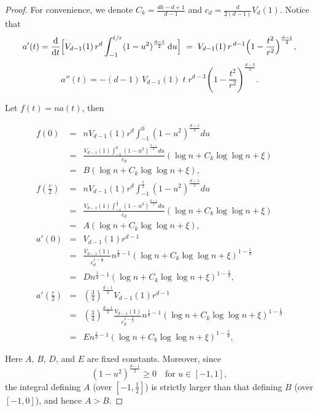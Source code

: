 \documentclass[preprint,12pt]{elsarticle}
\begin{document}
\begin{proof}
	For convenience, we denote $C_k=\frac{dk-d+1}{d-1}$ and $c_d = \frac{d}{2(d-1)}V_d(1)$. Notice that
	$$
	a'(t)
	=\frac{\mathrm{d}}{\mathrm{d}t}\Bigl[V_{d-1}(1)\,r^d
	\int_{-1}^{t/r}(1-u^2)^{\frac{d-1}2}\,\mathrm{d}u\Bigr]
	\;=\;V_{d-1}(1)\,r^{\,d-1}\Bigl(1-\frac{t^2}{r^2}\Bigr)^{\frac{d-1}2},
	$$
	$$
	a''(t)
	= - (d-1)\,V_{d-1}(1)\; t\; r^{d-3}\left(1 - \frac{t^2}{r^2}\right)^{\frac{d-3}{2}}.
	$$
	
	Let $f(t) = na(t)$, then
	
	\begin{eqnarray*}
		f(0) &=& nV_{d-1}(1)  r^d \int_{-1}^{0} (1 - u^2)^{\frac{d-1}{2}} du \\
		&=& \frac{V_{d-1}(1)\int_{-1}^{0} (1 - u^2)^{\frac{d-1}{2}}du}{c_d} \left( \log n+ C_k \log\log n+\xi\right)\\
		&=& B\left( \log n+ C_k \log\log n+\xi\right), \\
		f\left(\frac r2\right)
		&=&nV_{d-1}(1)  r^d \int_{-1}^{\frac{1}{2}} (1 - u^2)^{\frac{d-1}{2}} du\\
		&=&\frac{V_{d-1}(1)\int_{-1}^{\frac{1}{2}} (1 - u^2)^{\frac{d-1}{2}}du}{c_d} \left( \log n+ C_k \log\log n+\xi\right) \\
		&=& A\left( \log n+ C_k \log\log n+\xi\right), 	\\
		a'(0)
		&=&  V_{d-1}(1)  r^{d-1} \\
		&=& \frac{V_{d-1}(1)}{c_d^{1-\frac{1}{d}}}n^{\frac{1}{d}-1}\left(\log n+ C_k \log\log n+\xi\right)^{1-\frac{1}{d}} \\
		&=& Dn^{\frac{1}{d}-1}\left(\log n+ C_k \log\log n+\xi\right)^{1-\frac{1}{d}},\\
		a'(\frac{r}{2}) &
		=& \left(\frac{3}{4}\right)^{\frac{d-1}{2}}V_{d-1}(1)  r^{d-1} \\
		&=& \left(\frac{3}{4}\right)^{\frac{d-1}{2}}\frac{V_{d-1}(1)}{c_d^{1-\frac{1}{d}}}n^{\frac{1}{d}-1}\left(\log n+ C_k \log\log n+\xi\right)^{1-\frac{1}{d}} \\
		&=& E n^{\frac{1}{d}-1}\left(\log n+ C_k \log\log n+\xi\right)^{1-\frac{1}{d}},
	\end{eqnarray*}
	


	Here \(A\), \(B\), \(D\), and \(E\) are fixed constants.  Moreover, since
	$$
	(1 - u^2)^{\frac{d-1}{2}}\ge0
	\quad\text{for }u\in[-1,1],
	$$
	the integral defining \(A\) (over \([-1,\tfrac12]\)) is strictly larger than that defining \(B\) (over \([-1,0]\)), and hence $A>B$.
	

\end{proof}
\end{document}
